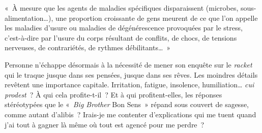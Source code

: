 \documentclass[french,twoside]{book} %
\newenvironment{quoteblock}%
  {\begin{quoting}}
  {\end{quoting}}
\newenvironment{quotebar}{%
    \def\FrameCommand{{\color{rubric!10!}\vrule width 0.5em} \hspace{0.9em}}%
    \def\OuterFrameSep{\itemsep} %
    \MakeFramed {\advance\hsize-\width \FrameRestore}
  }%
  {%
    \endMakeFramed
  }
\renewenvironment{quoteblock}%
  {%
    \savenotes
    \setstretch{0.9}
    \normalfont
    \begin{quotebar}
  }
  {%
    \end{quotebar}
    \spewnotes
  }
\begin{document}
\begin{quoteblock}
\noindent « À mesure que les agents de maladies spécifiques disparaissent (microbes, sous-alimentation…), une proportion croissante de gens meurent de ce que l’on appelle les maladies d’usure ou maladies de dégénérescence provoquées par le stress, c’est-à-dire par l’usure du corps résultant de conflits, de chocs, de tensions nerveuses, de contrariétés, de rythmes débilitants… »\end{quoteblock}

\noindent Personne n’échappe désormais à la nécessité de mener son enquête sur le \emph{racket} qui le traque jusque dans ses pensées, jusque dans ses rêves. Les moindres détails revêtent une importance capitale. Irritation, fatigue, insolence, humiliation… \emph{cui prodest} ? À qui cela profite-t-il ? Et à qui profitent-elles, les réponses stéréotypées que le « \emph{Big Brother} Bon Sens » répand sous couvert de sagesse, comme autant d’alibis ? Irais-je me contenter d’explications qui me tuent quand j’ai tout à gagner là même où tout est agencé pour me perdre ?
\end{document}
